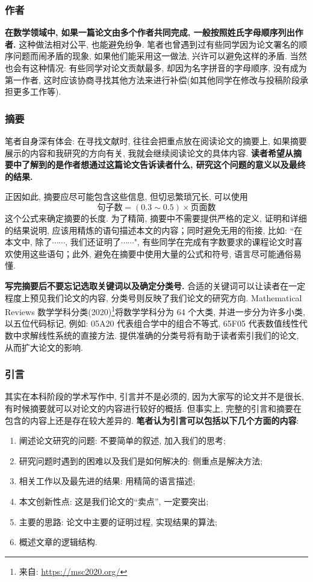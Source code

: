 \documentclass{formatBook}
\begin{document}
\subsubsection{作者}
\textbf{在数学领域中, 如果一篇论文由多个作者共同完成, 一般按照姓氏字母顺序列出作者.} 这种做法相对公平, 也能避免纷争. 笔者也曾遇到过有些同学因为论文署名的顺序问题而闹矛盾的现象, 如果他们能采用这一做法, 兴许可以避免这样的矛盾. 当然也会有这种情况: 有些同学对论文贡献最多, 却因为名字拼音的字母顺序, 没有成为第一作者, 这时应该协商寻找其他方法来进行补偿(如其他同学在修改与投稿阶段承担更多工作等).
\subsubsection{摘要}
笔者自身深有体会: 在寻找文献时, 往往会把重点放在阅读论文的摘要上, 如果摘要展示的内容和我研究的方向有关, 我就会继续阅读论文的具体内容. \textbf{读者希望从摘要中了解到的是作者想通过这篇论文告诉读者什么, 研究这个问题的意义以及最终的结果.}\par
正因如此, 摘要应尽可能包含这些信息, 但切忌繁琐冗长, 可以使用 $$\text{句子数}=(0.3 \sim 0.5)\times \text{页面数}$$ 这个公式\cite{pakhow}来确定摘要的长度. 为了精简, 摘要中不需要提供严格的定义, 证明和详细的结果说明, 应该用精炼的语句描述本文的内容；同时避免无用的衔接, 比如: {``}在本文中, 除了$\cdots\cdots$, 我们还证明了$\cdots\cdots$", 有些同学在完成有字数要求的课程论文时喜欢使用这些语句；此外, 避免在摘要中使用大量的公式和符号, 语言尽可能通俗易懂. \par
\textbf{写完摘要后不要忘记选取关键词以及确定分类号.} 合适的关键词可以让读者在一定程度上预见我们论文的内容, 分类号则反映了我们论文的研究方向. Mathematical Reviews 数学学科分类(2020)\footnote{来自: \url{https://msc2020.org/}}将数学学科分为 64 个大类, 并进一步分为许多小类, 以五位代码标记, 例如: 05A20 代表组合学中的组合不等式, 65F05 代表数值线性代数中求解线性系统的直接方法. 提供准确的分类号将有助于读者索引我们的论文, 从而扩大论文的影响.
\subsubsection{引言}
其实在本科阶段的学术写作中, 引言并不是必须的, 因为大家写的论文并不是很长, 有时候摘要就可以对论文的内容进行较好的概括. 但事实上, 完整的引言和摘要在包含的内容上还是存在较大差异的. \textbf{笔者认为引言可以包括以下几个方面的内容}:
\begin{enumerate}
    \item 阐述论文研究的问题: 不要简单的叙述, 加入我们的思考{;}
    \item 研究问题时遇到的困难以及我们是如何解决的: 侧重点是解决方法{;}
    \item 相关工作以及最先进的结果: 用精简的语言描述{;}
    \item 本文创新性点: 这是我们论文的{``}卖点'', 一定要突出{;}
    \item 主要的思路: 论文中主要的证明过程, 实现结果的算法{;}
    \item 概述文章的逻辑结构{.}
\end{enumerate}
\end{document}
